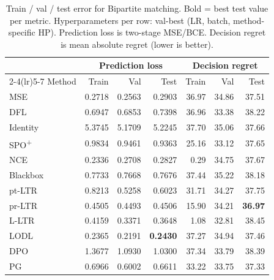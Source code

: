 \begin{table}[h]
\centering
\caption[Train/val/test error for Bipartite matching.]{Train / val / test error for Bipartite matching. Bold = best test value per metric. Hyperparameters per row: val-best (LR, batch, method-specific HP). Prediction loss is two-stage MSE/BCE. Decision regret is mean absolute regret (lower is better).}
\label{tab:err-bipartitematching}
\setlength{\tabcolsep}{4pt}
\renewcommand{\arraystretch}{1.05}
\begin{tabular}{@{}lrrrrrr@{}}
\toprule
& \multicolumn{3}{c}{Prediction loss} & \multicolumn{3}{c}{Decision regret} \\
\cmidrule(lr){2-4}\cmidrule(lr){5-7}
Method & Train & Val & Test & Train & Val & Test \\
\midrule
MSE & 0.2718 & 0.2563 & 0.2903 & 36.97 & 34.86 & 37.51 \\
DFL & 0.6947 & 0.6853 & 0.7398 & 36.96 & 33.38 & 38.22 \\
Identity & 5.3745 & 5.1709 & 5.2245 & 37.70 & 35.06 & 37.66 \\
SPO\textsuperscript{+} & 0.9834 & 0.9461 & 0.9363 & 25.16 & 33.12 & 37.65 \\
NCE & 0.2336 & 0.2708 & 0.2827 & 0.29 & 34.75 & 37.67 \\
Blackbox & 0.7733 & 0.7668 & 0.7676 & 37.44 & 35.22 & 38.18 \\
pt-LTR & 0.8213 & 0.5258 & 0.6023 & 31.71 & 34.27 & 37.75 \\
pr-LTR & 0.4505 & 0.4493 & 0.4506 & 15.90 & 34.21 & \textbf{36.97} \\
L-LTR & 0.4159 & 0.3371 & 0.3648 & 1.08 & 32.81 & 38.45 \\
LODL & 0.2365 & 0.2191 & \textbf{0.2430} & 37.27 & 34.94 & 37.46 \\
DPO & 1.3677 & 1.0930 & 1.0300 & 37.34 & 33.79 & 38.39 \\
PG & 0.6966 & 0.6002 & 0.6611 & 33.22 & 33.75 & 37.33 \\
\bottomrule
\end{tabular}
\end{table}


